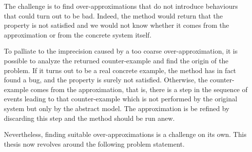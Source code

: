 The challenge is to find over-approximations that do not introduce
behaviours that could turn out to be bad. Indeed, the method would
return that the property is not satisfied and we would not know
whether it comes from the approximation or from the concrete system
itself.
% 
                  

To palliate  to the imprecision caused by a too coarse
over-approximation, it is possible to analyze the returned
counter-example and find the origin of the problem. If it turns out to
be a real concrete example, the method has in fact found a bug, and
the property is surely not satisfied. Otherwise, the counter-example
comes from the approximation, that is, there is a step in the sequence
of events leading to that counter-example which is not performed by
the original system but only by the abstract model. The approximation
is be refined by discarding this step and the method should be run
anew.

Nevertheless, finding suitable over-approximations is a challenge on
its own. %
This thesis now revolves around the following problem statement.

